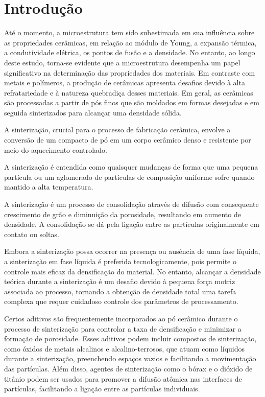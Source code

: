
\section*{Introdução}

Até o momento, a microestrutura tem sido subestimada em sua influência sobre as propriedades cerâmicas, em relação ao módulo de Young, a expansão térmica, a condutividade elétrica, os pontos de fusão e a densidade. No entanto, ao longo deste estudo, torna-se evidente que a microestrutura desempenha um papel significativo na determinação das propriedades dos materiais. Em contraste com metais e polímeros, a produção de cerâmicas apresenta desafios devido à alta refratariedade e à natureza quebradiça desses materiais. Em geral, as cerâmicas são processadas a partir de pós finos que são moldados em formas desejadas e em seguida sinterizados para alcançar uma densidade sólida.

A sinterização, crucial para o processo de fabricação cerâmica, envolve a conversão de um compacto de pó em um corpo cerâmico denso e resistente por meio do aquecimento controlado.

\begin{remark}
    A sinterização é entendida como quaisquer mudanças de forma que uma pequena partícula ou um aglomerado de partículas de composição uniforme sofre quando mantido a alta temperatura.
\end{remark}

\begin{definition}
    A sinterização é um processo de consolidação através de difusão com consequente crescimento de grão e diminuição da porosidade, resultando em aumento de densidade. A consolidação se dá pela ligação entre as partículas originalmente em contato ou soltas.
\end{definition}

Embora a sinterização possa ocorrer na presença ou ausência de uma fase líquida, a sinterização em fase líquida é preferida tecnologicamente, pois permite o controle mais eficaz da densificação do material. No entanto, alcançar a densidade teórica durante a sinterização é um desafio devido à pequena força motriz associada ao processo, tornando a obtenção de densidade total uma tarefa complexa que requer cuidadoso controle dos parâmetros de processamento.

Certos aditivos são frequentemente incorporados ao pó cerâmico durante o processo de sinterização para controlar a taxa de densificação e minimizar a formação de porosidade. Esses aditivos podem incluir compostos de sinterização, como óxidos de metais alcalinos e alcalino-terrosos, que atuam como líquidos durante a sinterização, preenchendo espaços vazios e facilitando a movimentação das partículas. Além disso, agentes de sinterização como o bórax e o dióxido de titânio podem ser usados para promover a difusão atômica nas interfaces de partículas, facilitando a ligação entre as partículas individuais.

